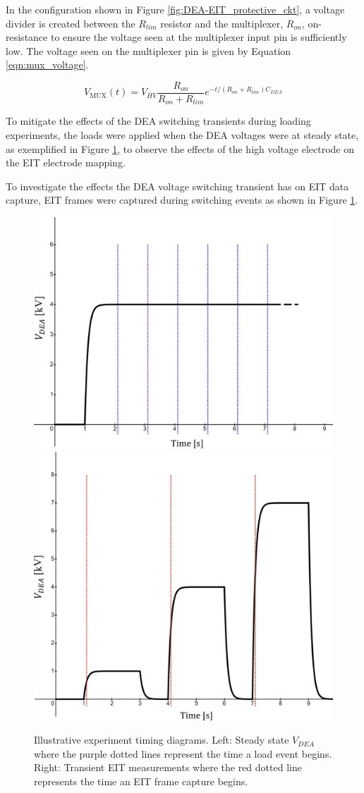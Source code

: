 In the configuration shown in Figure \ref{fig:DEA-EIT_protective_ckt}, a voltage divider is created between the $R_{lim}$ resistor and the multiplexer, $R_{on}$, on-resistance to ensure the voltage seen at the multiplexer input pin is sufficiently low. The voltage seen on the multiplexer pin is given by Equation \ref{eqn:mux_voltage}.

\begin{equation}
	V_{\mathrm{MUX}}(t) = V_{\mathit{HV}} \frac{R_{on}}{R_{on}+R_{lim}} e^{-t / (R_{on}+R_{lim})C_{\mathit{DEA}}}
	\label{eqn:mux_voltage}
\end{equation}

To mitigate the effects of the DEA switching transients during loading experiments, the loads were applied when the DEA voltages were at steady state, as exemplified in Figure \ref{fig:dea-eit_timing}, to observe the effects of the high voltage electrode on the EIT electrode mapping.

To investigate the effects the DEA voltage switching transient has on EIT data capture, EIT frames were captured during switching events as shown in Figure \ref{fig:dea-eit_timing}.

\begin{figure}[H]
	\centering
	\includegraphics[width=0.39\linewidth]{Figures/DEA-EIT_SS_loads_example_relabelled.png}
	\hspace{1cm}
	\includegraphics[width=0.4\linewidth]{Figures/DEA-EIT_transient_VDEA_example_relabelled.png}
	\vspace{0.3cm}
	\caption{Illustrative experiment timing diagrams. Left: Steady state $V_{DEA}$ where the purple dotted lines represent the time a load event begins. Right: Transient EIT measurements where the red dotted line represents the time an EIT frame capture begins.}
	\label{fig:dea-eit_timing}
\end{figure}



